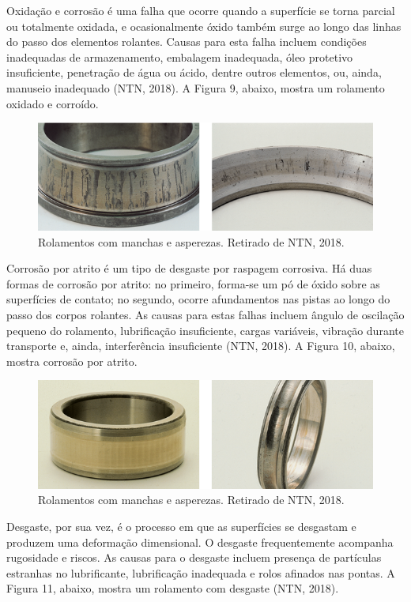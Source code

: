 \documentclass[
	12pt,				
	oneside,			
	a4paper,			
	english,			
	brazil				
	]{abntex2ppgsi}
\begin{document}
Oxidação e corrosão é uma falha que ocorre quando a superfície se torna parcial ou totalmente oxidada, e ocasionalmente óxido também surge ao longo das linhas do passo dos elementos rolantes. Causas para esta falha incluem condições inadequadas de armazenamento, embalagem inadequada, óleo protetivo insuficiente, penetração de água ou ácido, dentre outros elementos, ou, ainda, manuseio inadequado (NTN, 2018). A Figura 9, abaixo, mostra um rolamento oxidado e corroído.

\begin{figure}[!htb]
\centering
\includegraphics{Figura9}
\caption {Rolamentos com manchas e asperezas. Retirado de NTN, 2018.}
\label{Figura9}
\end{figure}

Corrosão por atrito é um tipo de desgaste por raspagem corrosiva. Há duas formas de corrosão por atrito: no primeiro, forma-se um pó de óxido sobre as superfícies de contato; no segundo, ocorre afundamentos nas pistas ao longo do passo dos corpos rolantes. As causas para estas falhas incluem ângulo de oscilação pequeno do rolamento, lubrificação insuficiente, cargas variáveis, vibração durante transporte e, ainda, interferência insuficiente (NTN, 2018). A Figura 10, abaixo, mostra corrosão por atrito.

\begin{figure}[!htb]
\centering
\includegraphics{Figura10}
\caption {Rolamentos com manchas e asperezas. Retirado de NTN, 2018.}
\label{Figura10}
\end{figure}

Desgaste, por sua vez, é o processo em que as superfícies se desgastam e produzem uma deformação dimensional. O desgaste frequentemente acompanha rugosidade e riscos. As causas para o desgaste incluem presença de partículas estranhas no lubrificante, lubrificação inadequada e rolos afinados nas pontas. A Figura 11, abaixo, mostra um rolamento com desgaste (NTN, 2018).
\end{document}
